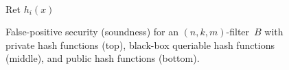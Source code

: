 \begin{figure}
{{\medskip
{}\\
Ret $h_i(x)$\\
}
}
 \caption{False-positive security (soundness) for an
$(n,k,m)$-filter~$B$ with private hash functions (top), black-box
queriable hash functions (middle), and public hash functions
(bottom).  } \label{fig:fp-filter}
\end{figure}




